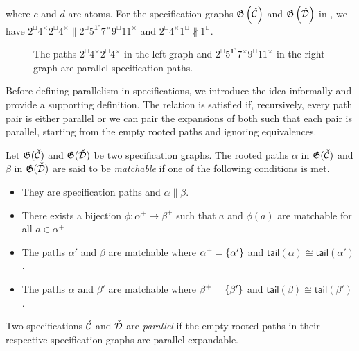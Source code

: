 where $c$ and $d$ are atoms. For the specification graphs $\mathfrak{G}\left(\check{\mathcal{C}}\right)$ and $\mathfrak{G}\left(\check{\mathcal{D}}\right)$ in , we have $2^\sqcup4^\times2^\sqcup4^\times \parallel 2^\sqcup5^{\mathbf{1}^\circ}7^\times9^\sqcup11^\times$ and $2^\sqcup4^\times1^\sqcup \nparallel 1^\sqcup$.
\begin{figure}[ht!]
    \centering
    
    \caption{The paths $2^\sqcup4^\times2^\sqcup4^\times$ in the left graph and $2^\sqcup5^{\mathbf{1}^\circ}7^\times9^\sqcup11^\times$ in the right graph are parallel specification paths.}
    \label{fig:para_path}
\end{figure}

Before defining parallelism in specifications, we introduce the idea informally and provide a supporting definition. The relation is satisfied if, recursively, every path pair is either parallel or we can pair the expansions of both such that each pair is parallel, starting from the empty rooted paths and ignoring equivalences.

Let $\mathfrak{G}(\check{\mathcal{C}})$ and $\mathfrak{G}(\check{\mathcal{D}})$ be two specification graphs. The rooted paths $\alpha$ in $\mathfrak{G}(\check{\mathcal{C}})$ and $\beta$ in $\mathfrak{G}(\check{\mathcal{D}})$ are said to be \emph{matchable} if one of the following conditions is met.
\begin{itemize}
    \item They are specification paths and $\alpha \parallel \beta$.
    \item There exists a bijection $\phi: \alpha^+ \mapsto \beta^+$ such that $a$ and $\phi(a)$ are matchable for all $a\in \alpha^+$
    \item The paths $\alpha'$ and $\beta$ are matchable where $\alpha^+ = \left\{\alpha'\right\}$ and $\textsf{tail}(\alpha) \cong \textsf{tail}(\alpha')$.
    \item The paths $\alpha$ and $\beta'$ are matchable where $\beta^+ = \left\{\beta'\right\}$ and $\textsf{tail}(\beta) \cong \textsf{tail}(\beta')$.
\end{itemize}

\begin{definition}\label{def:parspec}
Two specifications $\check{\mathcal{C}}$ and $\check{\mathcal{D}}$ are \emph{parallel} if the empty rooted paths in their respective specification graphs are parallel expandable.
\end{definition}

